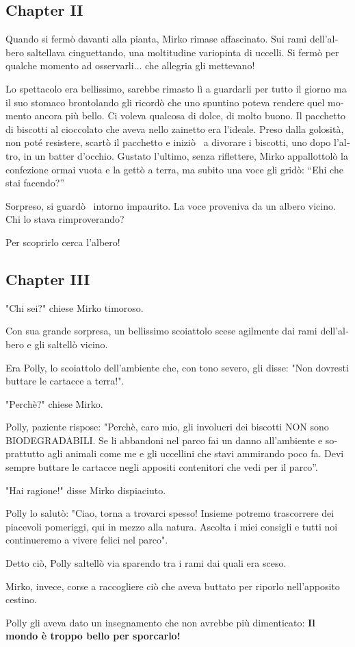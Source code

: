 \documentclass[a4paper,11pt]{report}
\begin{document}
\subsection{Chapter II}
\begin{otherlanguage}{italian}
Quando si ferm\`o davanti alla pianta, Mirko rimase affascinato. Sui rami dell'albero saltellava cinguettando, una moltitudine variopinta di uccelli. Si ferm\`o per qualche momento ad osservarli$\ldots$ che allegria gli mettevano!\par
Lo spettacolo era bellissimo, sarebbe rimasto l\`i a guardarli per tutto il giorno ma il suo stomaco brontolando gli ricord\`o che uno spuntino poteva rendere quel momento ancora pi\`u bello. Ci voleva qualcosa di dolce, di molto buono. Il pacchetto di biscotti al cioccolato che aveva nello zainetto era l'ideale. Preso dalla golosit\`a, non pot\'e resistere, scart\`o il pacchetto e inizi\`o~ a divorare i biscotti, uno dopo l'altro, in un batter d'occhio. Gustato l'ultimo, senza riflettere, Mirko appallottol\`o la confezione ormai vuota e la gett\`o a terra, ma subito una voce gli grid\`o: “Ehi che stai facendo?”\par
Sorpreso, si guard\`o~ intorno impaurito. La voce proveniva da un albero vicino. Chi lo stava rimproverando?\par
Per scoprirlo cerca l'albero!
\end{otherlanguage}
\subsection{Chapter III}
\begin{otherlanguage}{italian}
"Chi sei?" chiese Mirko timoroso.\par
Con sua grande sorpresa, un bellissimo scoiattolo scese agilmente dai rami dell'albero e gli saltell\`o vicino.\par
Era Polly, lo scoiattolo dell'ambiente che, con tono severo, gli disse: "Non dovresti buttare le cartacce a terra!".\par
"Perch\`e?" chiese Mirko.\par
Polly, paziente rispose: "Perch\`e, caro mio, gli involucri dei biscotti NON sono BIODEGRADABILI. Se li abbandoni nel parco fai un danno all'ambiente e soprattutto agli animali come me e gli uccellini che stavi ammirando poco fa. Devi sempre buttare le cartacce negli appositi contenitori che vedi per il parco”.\par
"Hai ragione!" disse Mirko dispiaciuto.\par
Polly lo salut\`o: "Ciao, torna a trovarci spesso! Insieme potremo trascorrere dei piacevoli pomeriggi, qui in mezzo alla natura. Ascolta i miei consigli e tutti noi continueremo a vivere felici nel parco".\par
Detto ci\`o, Polly saltell\`o via sparendo tra i rami dai quali era sceso.\par
Mirko, invece, corse a raccogliere ci\`o che aveva buttato per riporlo nell’apposito cestino.\par
Polly gli aveva dato un insegnamento che non avrebbe pi\`u dimenticato: \textbf{Il mondo \`e troppo bello per sporcarlo!}
\end{otherlanguage}
\end{document}
